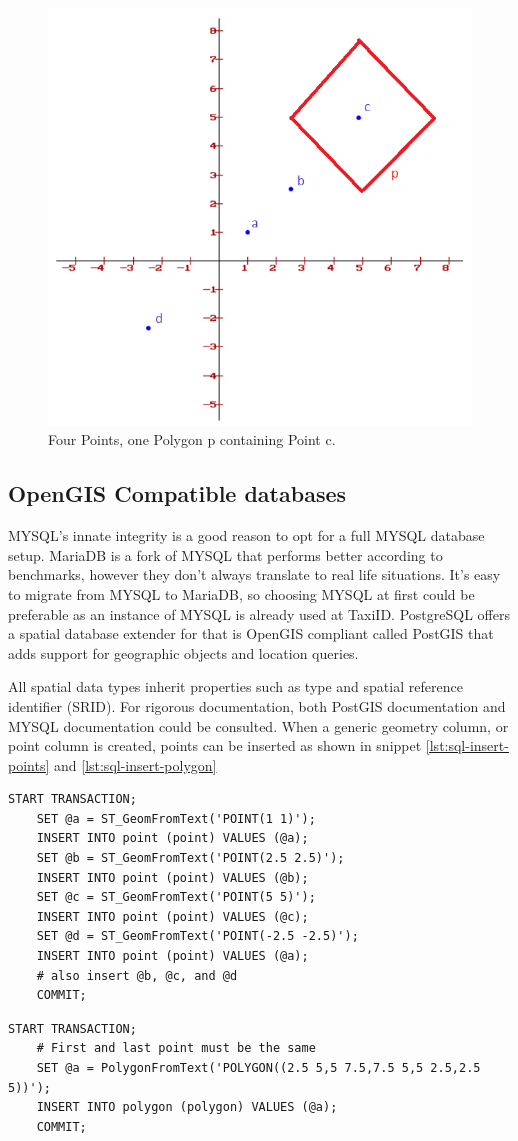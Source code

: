 
\begin{figure}[htbp!]
	\centering
	\includegraphics[width=.5\textwidth]{Square}
	\caption[Square]{Four Points, one Polygon p containing Point c.}
	\label{fig:square}
\end{figure}

\subsection{OpenGIS Compatible databases}
MYSQL’s innate integrity is a good reason to opt for a full MYSQL database setup. MariaDB is a fork of MYSQL that performs better according to benchmarks, however they don’t always translate to real life situations. It’s easy to migrate from MYSQL to MariaDB, so choosing MYSQL at first could be preferable as an instance of MYSQL is already used at TaxiID. PostgreSQL offers a spatial database extender for that is OpenGIS compliant called PostGIS that adds support for geographic objects and location queries.

All spatial data types inherit properties such as type and spatial reference identifier (SRID). For rigorous documentation, both PostGIS documentation \cite{PostGIS} and MYSQL documentation \cite{MySQL} could be consulted. When a generic geometry column, or point column is created, points can be inserted as shown in snippet \ref{lst:sql-insert-points} and \ref{lst:sql-insert-polygon}

\begin{multicols}{2}
	\begin{lstlisting}[caption={Insert four points}, label={lst:sql-insert-points}, belowskip=100pt]
	START TRANSACTION;
	SET @a = ST_GeomFromText('POINT(1 1)');
	INSERT INTO point (point) VALUES (@a);
	SET @b = ST_GeomFromText('POINT(2.5 2.5)');
	INSERT INTO point (point) VALUES (@b);
	SET @c = ST_GeomFromText('POINT(5 5)');
	INSERT INTO point (point) VALUES (@c);
	SET @d = ST_GeomFromText('POINT(-2.5 -2.5)');
	INSERT INTO point (point) VALUES (@a);
	# also insert @b, @c, and @d
	COMMIT;
\end{lstlisting}
	\begin{lstlisting}[caption={Insert polygon}, label={lst:sql-insert-polygon}, belowskip=0pt]
	START TRANSACTION;
	# First and last point must be the same
	SET @a = PolygonFromText('POLYGON((2.5 5,5 7.5,7.5 5,5 2.5,2.5 5))');
	INSERT INTO polygon (polygon) VALUES (@a);
	COMMIT;
\end{lstlisting}
\end{multicols}

